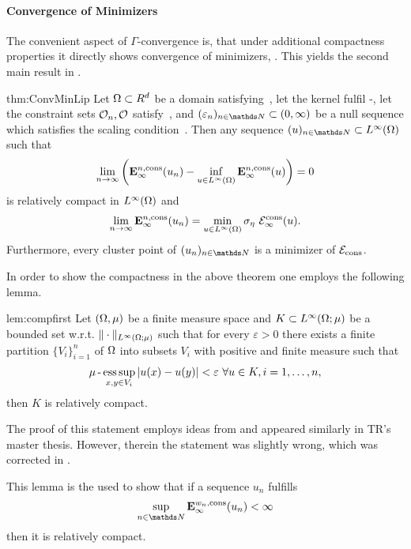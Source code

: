 \paragraph{Convergence of Minimizers}
%
The convenient aspect of $\Gamma$-convergence is, that under additional compactness properties it directly shows convergence of minimizers, \cite[Thm. 8]{Brad02}. This yields the second main result in \cite{roith2022continuum}.
%
%
\begin{theorem}{\cite[Thm. 2]{roith2022continuum}}{thm:ConvMinLip}
Let $\Omega\subset R^d$ be a domain satisfying~, 
let the kernel fulfil -, 
let the constraint sets $\mathcal{O}_n,\mathcal{O}$ satisfy~, 
and $(\gscale_n)_{n\in\N}\subset(0,\infty)$ be a null sequence which satisfies the scaling 
condition~.
Then any sequence $(u)_{n\in\N}\subset L^{\infty}(\Omega)$ such that 
\begin{align*}
\lim_{n\rightarrow\infty}\left(\mathbf{E}^{n,\mathrm{cons}}_\infty(u_n) - 
\inf_{u\in L^{\infty}(\Omega)}\mathbf{E}^{n,\mathrm{cons}}_\infty(u)\right) = 0
\end{align*}
is relatively compact in $L^{\infty}(\Omega)$ and 
\begin{align*}
\lim_{n\rightarrow\infty} \mathbf{E}^{n,\mathrm{cons}}_\infty(u_n) = 
\min_{u\in L^{\infty}(\Omega)}\sigma_{\eta}~\mathcal{E}^{\mathrm{cons}}_\infty(u).
\end{align*}
Furthermore, every cluster point of $(u_n)_{n\in\N}$ is a minimizer of 
$\mathcal{E}_{\mathrm{cons}}$. 
\end{theorem}
%
%
In order to show the compactness in the above theorem one employs the following lemma.
%
%
\begin{lemma}{\cite[Lem. 4]{roith2022continuum}}{lem:compfirst}
Let $(\Omega,\mu)$ be a finite measure space and $K\subset L^{\infty}(\Omega;\mu)$ be a bounded set w.r.t. $\|\cdot\|_{L^{\infty}(\Omega;\mu)}$ such that 
for every $\varepsilon>0$ there exists a finite partition $\{V_i\}_{i=1}^n$ of $\Omega$ into subsets $V_i$ with positive and finite measure such that
\begin{align}\label{eq:partinf}
\mu\operatorname{-}\operatorname*{ess\,sup}_{x,y\in V_i} \left|u(x) - u(y)\right| < \varepsilon\ \forall u\in K, i=1,\ldots,n,
\end{align}
then $K$ is relatively compact. 
\end{lemma}
%
\begin{remark}{}{}
The proof of this statement employs ideas from \cite[Lem. IV.5.4]{dunford1988linear} and appeared similarly in TR's master thesis. However, therein the statement was slightly wrong, which was corrected in \cite{roith2022continuum}.
\end{remark}
%
This lemma is the used to show that if a sequence $u_n$ fulfills
\begin{align*}
\sup_{n\in\N}\GE^{w_n,\text{cons}}_\infty(u_n)<\infty
\end{align*}
%
then it is relatively compact.
%
